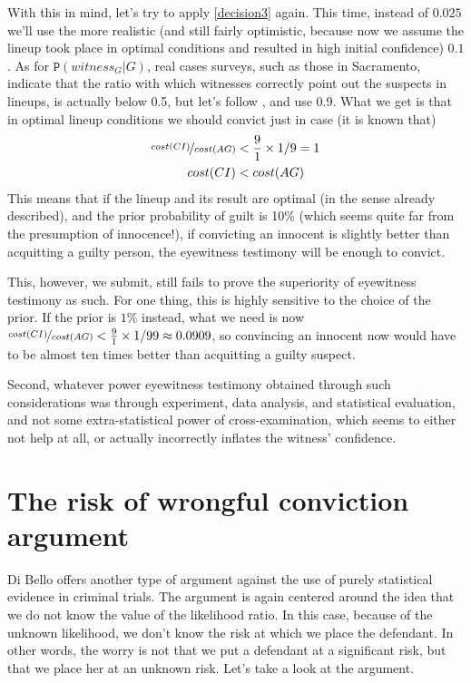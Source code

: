\documentclass{article}
\newcommand{\pr}[1]{\mbox{$\mathtt{P}(#1)$}}
\begin{document}
With this in mind, let's try to apply \eqref{decision3} again. This time, instead of $0.025$ we'll use the more realistic (and still fairly optimistic, because now we assume the lineup took place in optimal conditions and resulted in high initial confidence) $0.1$. As for $\pr{witness_G\vert G}$, real cases surveys, such as those in Sacramento, indicate that the ratio with which witnesses correctly point out the suspects in lineups, is actually below 0.5, but let's follow \citep[53]{wixted2017RelationshipEyewitnessConfidence}, and  use 0.9. What we get is that in optimal lineup conditions we should convict just in case (it is known that)
\begin{align}\label{eq:concrete} \nicefrac{cost(CI)}{cost(AG)} &< \frac{9}{1} \times 1/9 = 1 \\
cost(CI) & < cost(AG)
 \end{align}
\noindent This means that if the lineup and its result are optimal (in the sense already described), and the prior probability of guilt is 10\% (which seems quite far from the presumption of innocence!), if  convicting an innocent is slightly better than  acquitting a guilty person, the eyewitness testimony will be enough to convict. 

This, however, we submit, still fails to prove the superiority of eyewitness testimony as such. For one thing, this is highly sensitive to the choice of the prior. If the prior is $1\%$ instead, what we need is now $\nicefrac{cost(CI)}{cost(AG)} < \frac{9}{1} \times 1/99\approx 0.0909$, so convincing an innocent now would have to be almost ten times better than acquitting a guilty suspect. 

 Second, whatever power eyewitness testimony obtained through such considerations was through experiment, data analysis, and statistical evaluation, and not some extra-statistical power of cross-examination, which seems to either not help at all, or actually incorrectly inflates the witness' confidence. 








\section{The risk of wrongful conviction argument}\label{sec:risk}



Di Bello offers another type of argument against the use of purely statistical evidence in criminal trials. The argument is again centered around the idea that we do not know the value of the likelihood ratio. In this case, because of the unknown likelihood, we don't know the risk at which we place the defendant. In other words, the worry is not that we put a defendant at a significant risk, but that we place her at an unknown risk. Let's take a look at the argument.
\end{document}
